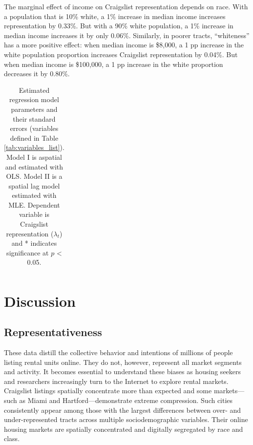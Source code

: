 \documentclass[11pt,letterpaper]{article}
\begin{document}
The marginal effect of income on Craigslist representation depends on race. With a population that is 10\% white, a 1\% increase in median income increases representation by 0.33\%. But with a 90\% white population, a 1\% increase in median income increases it by only 0.06\%. Similarly, in poorer tracts, \enquote{whiteness} has a more positive effect: when median income is \$8,000, a 1 pp increase in the white population proportion increases Craigslist representation by 0.04\%. But when median income is \$100,000, a 1 pp increase in the white proportion decreases it by 0.80\%.


\begin{small}
\begin{longtable}{l r r r r} 
	\caption{Estimated regression model parameters and their standard errors (variables defined in Table \ref{tab:variables_list}). Model I is aspatial and estimated with OLS. Model II is a spatial lag model estimated with MLE. Dependent variable is Craigslist representation ($\lambda_t$) and * indicates significance at $p$ < 0.05.}
	\label{tab:regression_results}
	
\end{longtable}
\end{small}


\section{Discussion}

\subsection{Representativeness}

These data distill the collective behavior and intentions of millions of people listing rental units online. They do not, however, represent all market segments and activity. It becomes essential to understand these biases as housing seekers and researchers increasingly turn to the Internet to explore rental markets. Craigslist listings spatially concentrate more than expected and some markets---such as Miami and Hartford---demonstrate extreme compression. Such cities consistently appear among those with the largest differences between over- and under-represented tracts across multiple sociodemographic variables. Their online housing markets are spatially concentrated and digitally segregated by race and class.
\end{document}
